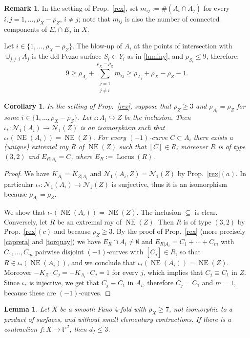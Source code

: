 \documentclass[a4paper,12pt]{amsart}
\newtheorem{lemma}[thm]{Lemma}
\newtheorem{corollary}[thm]{Corollary}
\theoremstyle{definition}
\newtheorem{remark}[thm]{Remark}
\numberwithin{figure}{section}
\numberwithin{table}{section}
\newcommand{\pr}{\mathbb{P}}
\newcommand{\N}{\mathcal{N}_1}
\newcommand{\NE}{\operatorname{NE}}
\newcommand{\Lo}{\operatorname{Locus}}
\begin{document}
\begin{remark}\label{remconti}
  In the setting of Prop.~\ref{rex}, set $m_{ij}:=\#(A_i\cap A_j)$ for every $i,j=1,\dotsc,\rho_X-\rho_Z$, $i\neq j$; note that $m_{ij}$ is also the number of connected components of $E_i\cap E_j$ in $X$.

Let $i\in \{1,\dotsc,\rho_X-\rho_Z\}$. The blow-up of $A_i$ at the points of  intersection with $\cup_{j\neq i}A_j$ is the del Pezzo surface $S_i\subset Y_i$ as in \eqref{luminy}, and $\rho_{S_i}\leq 9$, therefore:
  \begin{equation}\label{conti}
    9\geq\rho_{A_i}+\sum_{\substack{j=1\\j\neq i}}^{\rho_X-\rho_Z} m_{ij}\geq \rho_{A_i}+\rho_X-\rho_Z-1.
    \end{equation}
  \end{remark}
    \begin{corollary}\label{important}
    In the setting of Prop.~\ref{rex}, suppose that $\rho_Z\geq 3$ and  $\rho_{A_i}=\rho_Z$ for some $i\in\{1,\dotsc,\rho_X-\rho_Z\}$. Let $\iota\colon A_i\hookrightarrow Z$ be the inclusion.
    Then $\iota_*\colon \N(A_i)\to\N(Z)$ is an isomorphism such that $\iota_*(\NE(A_i))=\NE(Z)$. For every $(-1)$-curve $C\subset A_i$ there exists a (unique) extremal ray $R$ of $\NE(Z)$ such that    $[C]\in R$; moreover $R$ is of type $(3,2)$ and  $E_{R|A_i}=C$, where $E_R:=\Lo(R)$.
  \end{corollary}
  \begin{proof}
We have $K_{A_i}=K_{Z|A_i}$ and  $\N(A_i,Z)=\N(Z)$ by  Prop.~\ref{rex}$(a)$. In particular $\iota_*\colon \N(A_i)\to\N(Z)$ is surjective, thus it is an isomorphism because $\rho_{A_i}=\rho_Z$.
    
We show that  $\iota_*(\NE(A_i))=\NE(Z)$. The inclusion
$\subseteq$
 is clear. Conversely, let $R$ be an extremal ray of $\NE(Z)$. Then $R$ is of type $(3,2)$ by Prop.~\ref{rex}$(c)$ and because $\rho_Z\geq 3$. By the proof of Prop.~\ref{rex} (more precisely \ref{caprera} and \ref{torquay}) we have $E_R\cap A_i\neq\emptyset$ and $E_{R|A_i}=C_1+\cdots+C_m$ with $C_1,\dotsc,C_m$ pairwise disjoint $(-1)$-curves with $[C_j]\in R$, so that $R\in\iota_*(\NE(A_i))$, and we conclude that $\iota_*(\NE(A_i))=\NE(Z)$. Moreover  $-K_Z\cdot C_j=-K_{A_i}\cdot C_j=1$ for every $j$, which implies that $C_j\equiv C_1$ in $Z$. Since $\iota_*$ is injective, we get that $C_j\equiv C_1$ in $A_i$, therefore $C_j=C_1$ and $m=1$, because these are $(-1)$-curves.
  \end{proof}
  \begin{lemma}\label{pasqua2}
             Let $X$ be a smooth Fano $4$-fold with $\rho_X\geq 7$, not isomorphic to a product of surfaces, and without small elementary contractions.
            If there is a contraction
$f\colon X\to \pr^2$, then  $d_f\leq 3$.
\end{lemma}
\end{document}
